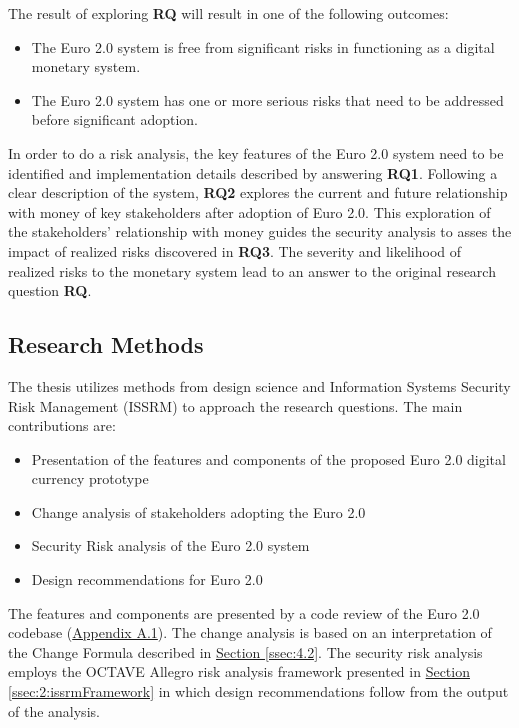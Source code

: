 \documentclass[a4paper,12pt]{article} %
\newcommand{\hypersectionref}[1]{\hyperref[#1]{Section \ref{#1}}}
\begin{document}
The result of exploring \textbf{RQ} will result in one of the following outcomes:
\begin{itemize}
	\item The Euro 2.0 system is free from significant risks in functioning as a digital monetary system.
	\item The Euro 2.0 system has one or more serious risks that need to be addressed before significant adoption.
\end{itemize}

In order to do a risk analysis, the key features of the Euro 2.0 system need to be identified and implementation details described by answering \textbf{RQ1}. Following a clear description of the system, \textbf{RQ2} explores the current and future relationship with money of key stakeholders after adoption of Euro 2.0. This exploration of the stakeholders' relationship with money guides the security analysis to asses the impact of realized risks discovered in \textbf{RQ3}. The severity and likelihood of realized risks to the monetary system lead to an answer to the original research question \textbf{RQ}.

\subsection{Research Methods} \label{ssec:1.3}
The thesis utilizes methods from design science and Information Systems Security Risk Management (ISSRM) to approach the research questions. The main contributions are:
\begin{itemize}
	\item Presentation of the features and components of the proposed Euro 2.0 digital currency prototype
	\item Change analysis of stakeholders adopting the Euro 2.0
	\item Security Risk analysis of the Euro 2.0 system
	\item Design recommendations for Euro 2.0
\end{itemize}

The features and components are presented by a code review of the Euro 2.0 codebase (\hyperref[ssec:a.1]{Appendix A.1}). The change analysis is based on an interpretation of the Change Formula\cite{changeFormula2014} described in \hypersectionref{ssec:4.2}. The security risk analysis employs the OCTAVE Allegro risk analysis framework presented in \hypersectionref{ssec:2:issrmFramework} in which design recommendations follow from the output of the analysis.
\end{document}
